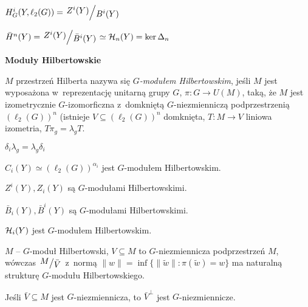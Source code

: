 

 


\begin{uwaga}
	$H^i_G(Y, \ell_2(G)) = \bigslant{Z^i(Y)}{B^i(Y)}$
	
	$\bar{H}^n(Y) = \bigslant{Z^i(Y)}{\bar{B}^i(Y)} \simeq 
	\H_n(Y) = \ker \Delta_n$
\end{uwaga}

{\bf Moduły Hilbertowskie}

\begin{definicja}
	$M$ przestrzeń Hilberta nazywa się \emph{$G$-modułem Hilbertowskim},
	jeśli $M$ jest wyposażona w~reprezentację unitarną grupy $G$,
	$\pi:G \to U(M)$, taką, że $M$ jest izometrycznie $G$-izomorficzna
	z~domkniętą $G$-niezmienniczą podprzestrzenią $(\ell_2(G))^n$
	(istnieje $V \subseteq (\ell_2(G))^n$ domknięta, $T:M \to V$ 
	liniowa izometria, $T \pi_g = \lambda_g T$.
\end{definicja}

\begin{lemat}
	$\delta_i \lambda_g = \lambda_g \delta_i$
\end{lemat}


\begin{fakt}
	$C_i(Y) \simeq (\ell_2(G))^{\alpha_i}$ jest $G$-modułem Hilbertowskim.
	
	$Z^i(Y), Z_i(Y)$ są $G$-modułami Hilbertowskimi.
	
	$\bar{B}_i(Y), \bar{B}^i(Y)$ są $G$-modułami Hilbertowskimi.
\end{fakt}

\begin{wniosek}
	${\mathcal{H}}_i(Y)$ jest $G$-modułem Hilbertowskim.
\end{wniosek}

\begin{lemat}
	$M$ -- $G$-moduł Hilbertowski, 
	$V \subseteq M$ to $G$-niezmiennicza podprzestrzeń $M$,
	wówczas $\bigslant M {\bar{V}}$
	z~normą $\| w \| = \inf \{ \| \tilde{w} \| : \pi(\tilde{w}) = w \}$
	ma naturalną strukturę $G$-modułu Hilbertowskiego.
\end{lemat}

\begin{lemat}
	Jeśli $\bar{V} \subseteq M$ jest $G$-niezmiennicza,
	to $\bar{V}^\perp$ jest $G$-niezmiennicze.
\end{lemat}

